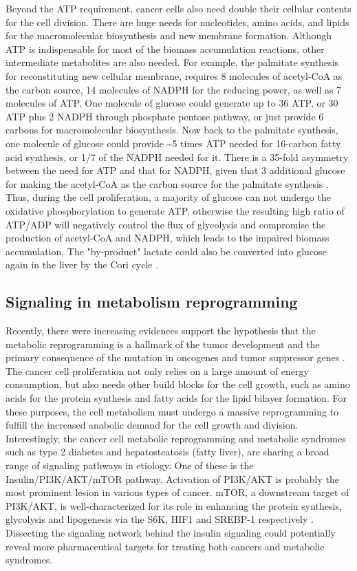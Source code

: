 Beyond the ATP requirement, cancer cells also need double their cellular contents for the cell division. There are huge needs for nucleotides, amino acids, and lipids for the macromolecular biosynthesis and new membrane formation. Although ATP is indispensable for most of the biomass accumulation reactions, other intermediate metabolites are also needed. For example, the palmitate synthesis for reconstituting new cellular membrane, requires 8 molecules of acetyl-CoA as the carbon source, 14 molecules of NADPH for the reducing power, as well as 7 molecules of ATP. One molecule of glucose could generate up to 36 ATP, or 30 ATP plus 2 NADPH through phosphate pentose pathway, or just provide 6 carbons for macromolecular biosynthesis. Now back to the palmitate synthesis, one molecule of glucose could provide \textasciitilde5 times ATP needed for 16-carbon fatty acid synthesis, or 1/7 of the NADPH needed for it. There is a 35-fold asymmetry between the need for ATP and that for NADPH, given that 3 additional glucose for making the acetyl-CoA as the carbon source for the palmitate synthesis \cite{nelson_lehninger_2013}. Thus, during the cell proliferation, a majority of glucose can not undergo the oxidative phosphorylation to generate ATP, otherwise the resulting high ratio of ATP/ADP will negatively control the flux of glycolysis and compromise the production of acetyl-CoA and NADPH, which leads to the impaired biomass accumulation. The "by-product" lactate could also be converted into glucose again in the liver by the Cori cycle \cite{nelson_lehninger_2013}.


\subsection{Signaling in metabolism reprogramming}

Recently, there were increasing evidences support the hypothesis that the metabolic reprogramming is a hallmark of the tumor development and the primary consequence of the mutation in oncogenes and tumor suppressor genes \cite{hanahan_hallmarks_2011,ward_metabolic_2012}. The cancer cell proliferation not only relies on a large amount of energy consumption, but also needs other build blocks for the cell growth, such as amino acids for the protein synthesis and fatty acids for the lipid bilayer formation. For these purposes, the cell metabolism must undergo a massive reprogramming to fulfill the increased anabolic demand for the cell growth and division. Interestingly, the cancer cell metabolic reprogramming and metabolic syndromes such as type 2 diabetes and hepatosteatosis (fatty liver), are sharing a broad range of signaling pathways in etiology. One of these is the Insulin/PI3K/AKT/mTOR pathway. Activation of PI3K/AKT is probably the most prominent lesion in various types of cancer. mTOR, a downstream target of PI3K/AKT, is well-characterized for its role in enhancing the protein synthesis, glycolysis and lipogenesis via the S6K, HIF1\textalpha{} and SREBP-1 respectively \cite{duvel_activation_2010,hagiwara_hepatic_2012,sun_mammalian_2011}. Dissecting the signaling network behind the insulin signaling could potentially reveal more pharmaceutical targets for treating both cancers and metabolic syndromes. 




